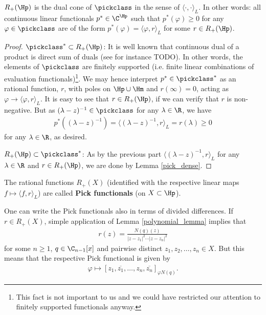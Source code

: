 \begin{lause}\label{pick_functionals}
	$R_{+}(\Hp)$ is the dual cone of $\pickclass$ in the sense of $\langle \cdot, \cdot \rangle_{L}$. In other words: all continuous linear functionals $p^{*} \in \C^{\Hp}$ such that $p^{*}(\varphi) \geq 0$ for any $\varphi \in \pickclass$ are of the form $p^{*}(\varphi) = \langle \varphi, r \rangle_{L}$ for some $r \in R_{+}(\Hp)$.
\end{lause}
\begin{proof}
	$\pickclass^{*} \subset R_{+}(\Hp)$: It is well known that continuous dual of a product is direct sum of duals (see for instance TODO). In other words, the elements of $\pickclass$ are finitely supported (i.e. finite linear combinations of evaluation functionals)\footnote{This fact is not important to us and we could have restricted our attention to finitely supported functionals anyway.}. We may hence interpret $p^{*} \in \pickclass^{*}$ as an rational function, $r$, with poles on $\Hp \cup \Hm$ and $r(\infty) = 0$, acting as $\varphi \to \langle \varphi, r \rangle_{L}$. It is easy to see that $r \in R_{+}(\Hp)$, if we can verify that $r$ is non-negative. But as $(\lambda - z)^{-1} \in \pickclass$ for any $\lambda \in \R$, we have
	\begin{align*}
		p^{*}((\lambda - z)^{-1}) = \langle (\lambda - z)^{-1}, r \rangle_{L} = r(\lambda) \geq 0
	\end{align*}
	for any $\lambda \in \R$, as desired.

	$R_{+}(\Hp) \subset \pickclass^{*}$: As by the previous part $\langle (\lambda - z)^{-1}, r \rangle_{L}$ for any $\lambda \in \R$ and $r \in R_{+}(\Hp)$, we are done by Lemma \ref{pick_dense}.
\end{proof}

The rational functions $R_{+}(X)$ (identified with the respective linear maps $f \mapsto \langle f, r \rangle_{L}$) are called \textbf{Pick functionals} (on $X \subset \Hp$).

One can write the Pick functionals also in terms of divided differences. If $r \in R_{+}(X)$, simple application of Lemma \ref{polynomial_lemma} implies that
\begin{align*}
	r(z) = \frac{N(q)(z)}{|z - z_{1}|^2 \cdots |z - z_{n}|^2}
\end{align*}
for some $n \geq 1$, $q \in \C_{n - 1}[x]$ and pairwise distinct $z_{1}, z_{2}, \ldots, z_{n} \in X$. But this means that the respective Pick functional is given by
\begin{align*}
	\varphi \mapsto [z_{1}, \overline{z_{1}}, \ldots, z_{n}, \overline{z_{n}}]_{\varphi N(q)}.
\end{align*}

